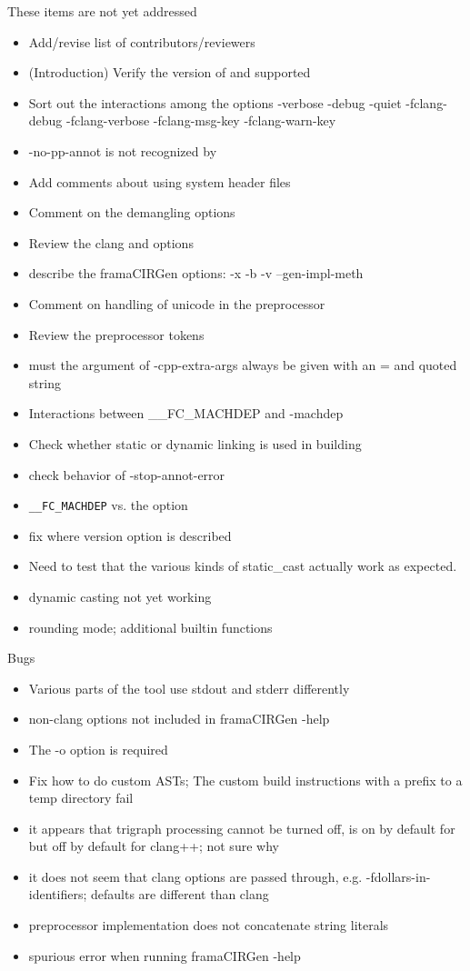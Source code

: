 \documentclass[web]{frama-c-book}
\begin{document}
These items are not yet addressed
\begin{itemize}
\item Add/revise list of contributors/reviewers
\item (Introduction) Verify the version of \framac and \clang supported
\item Sort out the interactions among the options -verbose -debug -quiet -fclang-debug -fclang-verbose -fclang-msg-key -fclang-warn-key
\item -no-pp-annot is not recognized by \fclang
\item Add comments about using system header files
\item Comment on the demangling options
\item Review the clang and \irg options
\item describe the framaCIRGen options: -x -b -v --gen-impl-meth
\item Comment on handling of unicode in the preprocessor
\item Review the preprocessor tokens
\item must the argument of -cpp-extra-args always be given with an = and quoted string
\item Interactions between \_\_FC\_MACHDEP and -machdep
\item Check whether static or dynamic linking is used in building
\item check behavior of -stop-annot-error
\item \lstinline|__FC_MACHDEP| vs. the option
\item fix where version option is described
\item Need to test that the various kinds of static_cast actually work as expected.
\item dynamic casting not yet working
\item rounding mode; additional builtin functions
\end{itemize}

Bugs
\begin{itemize}
\item Various parts of the tool use stdout and stderr differently
\item non-clang options not included in framaCIRGen -help
\item The -o option is required
\item Fix how to do custom ASTs; The custom build instructions with a prefix to a temp directory fail
\item it appears that trigraph processing cannot be turned off, is on by default for \irg but off by default for clang++; not sure why
\item it does not seem that clang options are passed through, e.g. -fdollars-in-identifiers; \irg defaults are different than clang
\item preprocessor implementation does not concatenate string literals
\item spurious error when running  framaCIRGen -help
\end{itemize}
\end{document}
